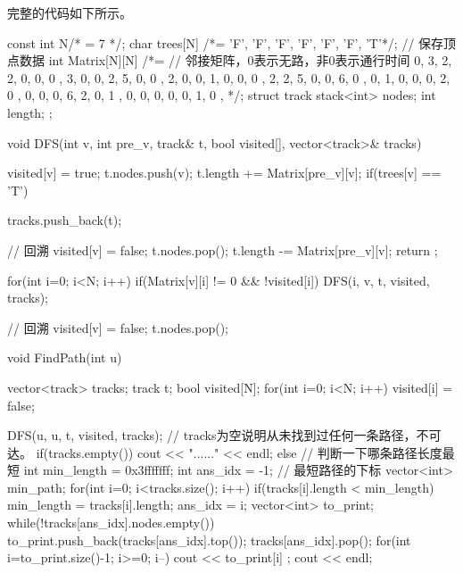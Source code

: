 完整的代码如下所示。
\begin{cppcode}
    const int N/* = 7 */;
    char trees[N] /*= {'F', 'F', 'F', 'F', 'F', 'F', 'T'}*/;    // 保存顶点数据
    int Matrix[N][N] /*= {    // 邻接矩阵，0表示无路，非0表示通行时间
        { 0, 3, 2, 2, 0, 0, 0 },
        { 3, 0, 0, 2, 5, 0, 0 },
        { 2, 0, 0, 1, 0, 0, 0 },
        { 2, 2, 5, 0, 0, 6, 0 },
        { 0, 1, 0, 0, 0, 2, 0 },
        { 0, 0, 0, 6, 2, 0, 1 },
        { 0, 0, 0, 0, 0, 1, 0 },
    }*/;
    struct track {
        stack<int> nodes;
        int length;
    };

    void DFS(int v, int pre_v, track& t, bool visited[], vector<track>& tracks) {
        visited[v] = true;
        t.nodes.push(v);
        t.length += Matrix[pre_v][v];
        if(trees[v] == 'T') {
            tracks.push_back(t);

            // 回溯
            visited[v] = false;
            t.nodes.pop();
            t.length -= Matrix[pre_v][v];
            return ;
        }

        for(int i=0; i<N; i++) {
            if(Matrix[v][i] != 0 && !visited[i]) {
                DFS(i, v, t, visited, tracks);
            }
        }

        // 回溯
        visited[v] = false;
        t.nodes.pop();
    }

    void FindPath(int u) {
        vector<track> tracks;
        track t;
        bool visited[N];
        for(int i=0; i<N; i++) {
            visited[i] = false;
        }

        DFS(u, u, t, visited, tracks);
        // tracks为空说明从未找到过任何一条路径，不可达。
        if(tracks.empty()) {
            cout << "......" << endl;
        } else {
            // 判断一下哪条路径长度最短
            int min_length = 0x3fffffff;
            int ans_idx = -1;   // 最短路径的下标
            vector<int> min_path;
            for(int i=0; i<tracks.size(); i++) {
                if(tracks[i].length < min_length) {
                    min_length = tracks[i].length;
                    ans_idx = i;
                }
            }
            vector<int> to_print;
            while(!tracks[ans_idx].nodes.empty()) {
                to_print.push_back(tracks[ans_idx].top());
                tracks[ans_idx].pop();
            }
            for(int i=to_print.size()-1; i>=0; i--) {
                cout << to_print[i] ;
            }
            cout << endl;
        }
    }
\end{cppcode}

